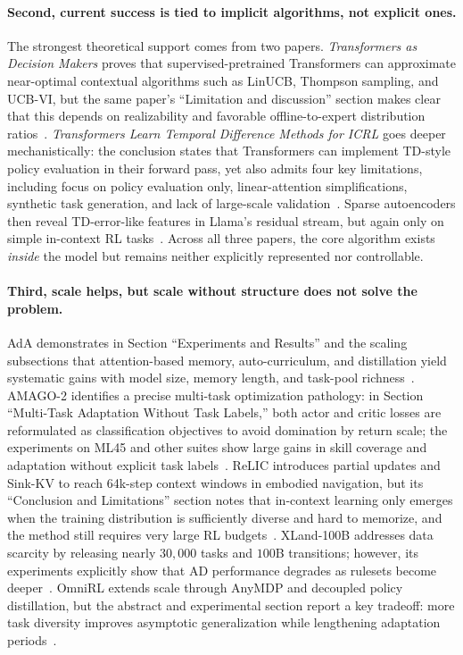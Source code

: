 \documentclass[10pt,twocolumn,letterpaper]{article}
\begin{document}
\paragraph{Second, current success is tied to implicit algorithms, not explicit ones.}
The strongest theoretical support comes from two papers. \emph{Transformers as Decision Makers} proves that supervised-pretrained Transformers can approximate near-optimal contextual algorithms such as LinUCB, Thompson sampling, and UCB-VI, but the same paper's ``Limitation and discussion'' section makes clear that this depends on realizability and favorable offline-to-expert distribution ratios~\cite{lin2023provableicrl}. \emph{Transformers Learn Temporal Difference Methods for ICRL} goes deeper mechanistically: the conclusion states that Transformers can implement TD-style policy evaluation in their forward pass, yet also admits four key limitations, including focus on policy evaluation only, linear-attention simplifications, synthetic task generation, and lack of large-scale validation~\cite{wang2024td}. Sparse autoencoders then reveal TD-error-like features in Llama's residual stream, but again only on simple in-context RL tasks~\cite{demircan2024sae}. Across all three papers, the core algorithm exists \emph{inside} the model but remains neither explicitly represented nor controllable.

\paragraph{Third, scale helps, but scale without structure does not solve the problem.}
AdA demonstrates in Section ``Experiments and Results'' and the scaling subsections that attention-based memory, auto-curriculum, and distillation yield systematic gains with model size, memory length, and task-pool richness~\cite{adaptive2023ada}. AMAGO-2 identifies a precise multi-task optimization pathology: in Section ``Multi-Task Adaptation Without Task Labels,'' both actor and critic losses are reformulated as classification objectives to avoid domination by return scale; the experiments on ML45 and other suites show large gains in skill coverage and adaptation without explicit task labels~\cite{grigsby2024amago2}. ReLIC introduces partial updates and Sink-KV to reach 64k-step context windows in embodied navigation, but its ``Conclusion and Limitations'' section notes that in-context learning only emerges when the training distribution is sufficiently diverse and hard to memorize, and the method still requires very large RL budgets~\cite{elawady2024relic}. XLand-100B addresses data scarcity by releasing nearly \(30{,}000\) tasks and \(100\)B transitions; however, its experiments explicitly show that AD performance degrades as rulesets become deeper~\cite{nikulin2024xland100b}. OmniRL extends scale through AnyMDP and decoupled policy distillation, but the abstract and experimental section report a key tradeoff: more task diversity improves asymptotic generalization while lengthening adaptation periods~\cite{wang2025omnirl}.
\end{document}
